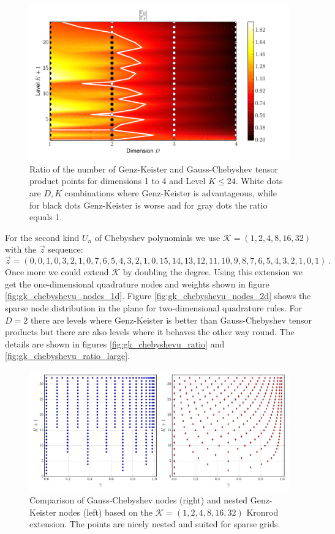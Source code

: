 \documentclass[a4paper,10pt]{article}
\begin{document}
\begin{figure}[h]
  \centering
  \includegraphics[width=0.8\linewidth]{./img/gk_chebyshevt_ratio_large.pdf}
  \caption{Ratio of the number of Genz-Keister and Gauss-Chebyshev tensor product
  points for dimensions 1 to 4 and Level $K \leq 24$. White dots are $D,K$
  combinations where Genz-Keister is advantageous, while for black dots
  Genz-Keister is worse and for gray dots the ratio equals 1.}
  \label{fig:gk_chebyshevt_ratio_large}
\end{figure}

For the second kind $U_n$ of Chebyshev polynomials we use
$\mathcal{K} = (1, 2, 4, 8, 16, 32)$ with the $\vec{z}$ sequence:
\begin{equation*}
  \vec{z} = (0, 0, 1, 0, 3, 2, 1, 0, 7, 6, 5, 4, 3, 2, 1, 0, 15, 14, 13, 12, 11,
             10, 9, 8, 7, 6, 5, 4, 3, 2, 1, 0, 1)\,.
\end{equation*}
Once more we could extend $\mathcal{K}$ by doubling the degree.
Using this extension we get the one-dimensional quadrature nodes and
weights shown in figure \ref{fig:gk_chebyshevu_nodes_1d}.
Figure \ref{fig:gk_chebyshevu_nodes_2d} shows the sparse
node distribution in the plane for two-dimensional quadrature rules.
For $D = 2$ there are levels where Genz-Keister is better than
Gauss-Chebyshev tensor products but there are also levels where
it behaves the other way round. The details are shown in figures
\ref{fig:gk_chebyshevu_ratio} and \ref{fig:gk_chebyshevu_ratio_large}.

\begin{figure}[h]
  \centering
  \includegraphics[width=\linewidth]{./img/gk_chebyshevu_nodes_cmp.pdf}
  \caption{Comparison of Gauss-Chebyshev nodes (right) and nested Genz-Keister nodes (left)
  based on the $\mathcal{K} = (1,2,4,8,16,32)$ Kronrod extension. The points are
  nicely nested and suited for sparse grids.}
  \label{fig:gk_chebyshevu_nodes_cmp}
\end{figure}
\end{document}
